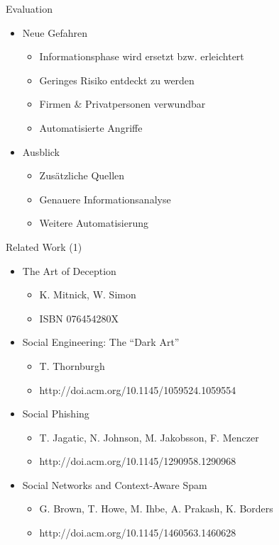 \documentclass[11pt]{beamer}
\begin{document}
\begin{frame}{Evaluation}
  \begin{itemize}
    \item Neue Gefahren
    \begin{itemize}
      \item Informationsphase wird ersetzt bzw. erleichtert
      \item Geringes Risiko entdeckt zu werden
      \item Firmen \& Privatpersonen verwundbar
      \item Automatisierte Angriffe
    \end{itemize}
    \item Ausblick
    \begin{itemize}
      \item Zusätzliche Quellen
      \item Genauere Informationsanalyse
      \item Weitere Automatisierung
    \end{itemize}
  \end{itemize}
\end{frame}

\begin{frame}{Related Work (1)}
  \begin{itemize}
    \item The Art of Deception
    \begin{itemize}
      \item K. Mitnick, W. Simon
      \item ISBN 076454280X
    \end{itemize}
    \item Social Engineering: The “Dark Art”
    \begin{itemize}
      \item T. Thornburgh
      \item http://doi.acm.org/10.1145/1059524.1059554
    \end{itemize}
    \item Social Phishing
    \begin{itemize}
      \item T. Jagatic, N. Johnson, M. Jakobsson, F. Menczer
      \item http://doi.acm.org/10.1145/1290958.1290968
    \end{itemize}
    \item Social Networks and Context-Aware Spam
    \begin{itemize}
      \item  G. Brown, T. Howe, M. Ihbe, A. Prakash, K. Borders
      \item http://doi.acm.org/10.1145/1460563.1460628
    \end{itemize}
  \end{itemize}
\end{frame}
\end{document}
